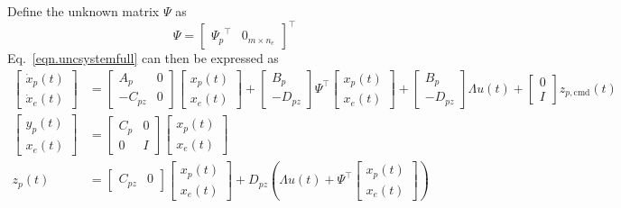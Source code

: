 Define the unknown matrix $\Psi$ as
\begin{equation*}
  \Psi=
  [\begin{array}{cc} {\Psi_{p}}^{\top} & 0_{m\times n_{e}} \end{array}]^{\top}
\end{equation*}
Eq.\ \eqref{eqn.uncsystemfull} can then be expressed as
\begin{equation}
  \label{eqn.uncertainss}
  \begin{split}
    \begin{bmatrix}
      \dot{x}_{p}(t) \\
      \dot{x}_{e}(t)
    \end{bmatrix}
    &=
    \begin{bmatrix}
      A_{p} & 0 \\
      -C_{pz} & 0
    \end{bmatrix}
    \begin{bmatrix}
      x_{p}(t) \\
      x_{e}(t)
    \end{bmatrix}+
    \begin{bmatrix}
      B_{p} \\
      -D_{pz}
    \end{bmatrix}\Psi^{\top}
    \begin{bmatrix}
      x_{p}(t) \\
      x_{e}(t)
    \end{bmatrix}+
    \begin{bmatrix}
      B_{p} \\
      -D_{pz}
    \end{bmatrix}\Lambda u(t) +
    \begin{bmatrix}
      0 \\
      I
    \end{bmatrix}z_{p,\text{cmd}}(t) \\
    \begin{bmatrix}
      y_{p}(t) \\
      x_{e}(t)
    \end{bmatrix}
    &=
    \begin{bmatrix}
      C_{p} & 0 \\
      0 & I
    \end{bmatrix}
    \begin{bmatrix}
      x_{p}(t) \\
      x_{e}(t)
    \end{bmatrix} \\
    z_{p}(t)
    &=
    \begin{bmatrix}
      C_{pz} & 0
    \end{bmatrix}
    \begin{bmatrix}
      x_{p}(t) \\
      x_{e}(t)
    \end{bmatrix}
    +
    D_{pz}\left(\Lambda u(t) + \Psi^{\top}
    \begin{bmatrix}
      x_{p}(t) \\
      x_{e}(t)
    \end{bmatrix}
    \right)
  \end{split}
\end{equation}
